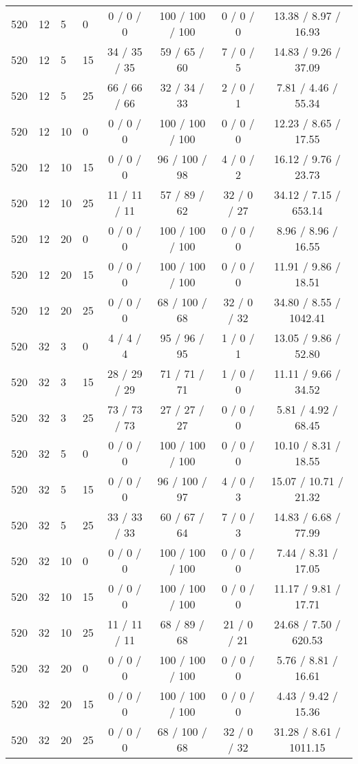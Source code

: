 \begin{table}[p]
\begin{tabular}{llllcccc}
520 & 12 & 5 & 0 & 0 / 0 / 0 & 100 / 100 / 100 & 0 / 0 / 0 & 13.38 / 8.97 / 16.93 \\
520 & 12 & 5 & 15 & 34 / 35 / 35 & 59 / 65 / 60 & 7 / 0 / 5 & 14.83 / 9.26 / 37.09 \\
520 & 12 & 5 & 25 & 66 / 66 / 66 & 32 / 34 / 33 & 2 / 0 / 1 & 7.81 / 4.46 / 55.34 \\
520 & 12 & 10 & 0 & 0 / 0 / 0 & 100 / 100 / 100 & 0 / 0 / 0 & 12.23 / 8.65 / 17.55 \\
520 & 12 & 10 & 15 & 0 / 0 / 0 & 96 / 100 / 98 & 4 / 0 / 2 & 16.12 / 9.76 / 23.73 \\
520 & 12 & 10 & 25 & 11 / 11 / 11 & 57 / 89 / 62 & 32 / 0 / 27 & 34.12 / 7.15 / 653.14 \\
520 & 12 & 20 & 0 & 0 / 0 / 0 & 100 / 100 / 100 & 0 / 0 / 0 & 8.96 / 8.96 / 16.55 \\
520 & 12 & 20 & 15 & 0 / 0 / 0 & 100 / 100 / 100 & 0 / 0 / 0 & 11.91 / 9.86 / 18.51 \\
520 & 12 & 20 & 25 & 0 / 0 / 0 & 68 / 100 / 68 & 32 / 0 / 32 & 34.80 / 8.55 / 1042.41 \\
520 & 32 & 3 & 0 & 4 / 4 / 4 & 95 / 96 / 95 & 1 / 0 / 1 & 13.05 / 9.86 / 52.80 \\
520 & 32 & 3 & 15 & 28 / 29 / 29 & 71 / 71 / 71 & 1 / 0 / 0 & 11.11 / 9.66 / 34.52 \\
520 & 32 & 3 & 25 & 73 / 73 / 73 & 27 / 27 / 27 & 0 / 0 / 0 & 5.81 / 4.92 / 68.45 \\
520 & 32 & 5 & 0 & 0 / 0 / 0 & 100 / 100 / 100 & 0 / 0 / 0 & 10.10 / 8.31 / 18.55 \\
520 & 32 & 5 & 15 & 0 / 0 / 0 & 96 / 100 / 97 & 4 / 0 / 3 & 15.07 / 10.71 / 21.32 \\
520 & 32 & 5 & 25 & 33 / 33 / 33 & 60 / 67 / 64 & 7 / 0 / 3 & 14.83 / 6.68 / 77.99 \\
520 & 32 & 10 & 0 & 0 / 0 / 0 & 100 / 100 / 100 & 0 / 0 / 0 & 7.44 / 8.31 / 17.05 \\
520 & 32 & 10 & 15 & 0 / 0 / 0 & 100 / 100 / 100 & 0 / 0 / 0 & 11.17 / 9.81 / 17.71 \\
520 & 32 & 10 & 25 & 11 / 11 / 11 & 68 / 89 / 68 & 21 / 0 / 21 & 24.68 / 7.50 / 620.53 \\
520 & 32 & 20 & 0 & 0 / 0 / 0 & 100 / 100 / 100 & 0 / 0 / 0 & 5.76 / 8.81 / 16.61 \\
520 & 32 & 20 & 15 & 0 / 0 / 0 & 100 / 100 / 100 & 0 / 0 / 0 & 4.43 / 9.42 / 15.36 \\
520 & 32 & 20 & 25 & 0 / 0 / 0 & 68 / 100 / 68 & 32 / 0 / 32 & 31.28 / 8.61 / 1011.15 \\

\end{tabular}
\end{table}
